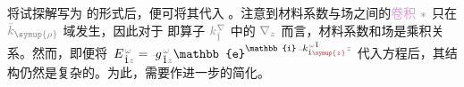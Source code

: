 将试探解写为  的形式后，便可将其代入 。注意到材料系数与场之间的\textcolor{Plum}{卷积} $\mathcolor{gray}{*}$ 只在 $\mathcolor{gray}{\bar{k}_{\symup{\rho}}}$ 域发生，因此对于  即算子 $\mathcolor{gray}{k^\nabla_{\check{1}}}$ 中的 $\mathcolor{gray}{\nabla_z}$ 而言，材料系数和场是乘积关系。然而，即便将 $\Xint{\mathcolor{gray}{-}}{25}{E}^{\;\!\mathcolor{gray}{\omega}}_{\;\! \hat{1} \mathcolor{gray}{z}} = \Xint{{}^{}_{\mathcolor{gray}{-}}}{10}{g}^{\;\!\mathcolor{gray}{\omega}}_{\;\! \breve{1} \mathcolor{gray}{z}} \mathbb{e}^{\mathbb{i} \Xint{\begin{smallmatrix} ~ \\ {}^{}_{\mathcolor{gray}{-}} \\ ~ \end{smallmatrix}}{15}{k}_{\hat{1} \textcolor{Maroon}{\symup{z}}}^{\;\! \mathcolor{gray}{\omega} \breve{1}} \mathcolor{gray}{z}}$ 代入方程后，其结构仍然是复杂的。为此，需要作进一步的简化。

